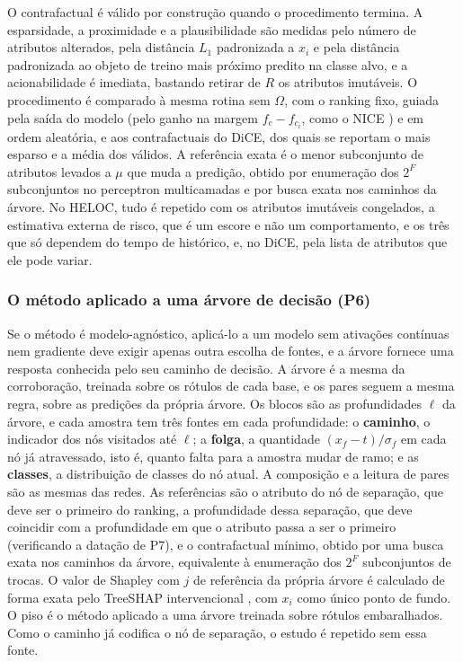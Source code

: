 O contrafactual é válido por construção quando o procedimento termina. A esparsidade, a proximidade e a plausibilidade \citep{Guidotti2022} são medidas pelo número de atributos alterados, pela distância $L_1$ padronizada a $x_i$ e pela distância padronizada ao objeto de treino mais próximo predito na classe alvo, e a acionabilidade é imediata, bastando retirar de $R$ os atributos imutáveis. O procedimento é comparado à mesma rotina sem $\Omega$, com o ranking fixo, guiada pela saída do modelo (pelo ganho na margem $f_c - f_{c_i}$, como o NICE \citep{Brughmans2024}) e em ordem aleatória, e aos contrafactuais do DiCE, dos quais se reportam o mais esparso e a média dos válidos. A referência exata é o menor subconjunto de atributos levados a $\mu$ que muda a predição, obtido por enumeração dos $2^{F}$ subconjuntos no perceptron multicamadas e por busca exata nos caminhos da árvore. No HELOC, tudo é repetido com os atributos imutáveis congelados, a estimativa externa de risco, que é um escore e não um comportamento, e os três que só dependem do tempo de histórico, e, no DiCE, pela lista de atributos que ele pode variar.

\subsubsection*{O método aplicado a uma árvore de decisão (P6)}

Se o método é modelo-agnóstico, aplicá-lo a um modelo sem ativações contínuas nem gradiente deve exigir apenas outra escolha de fontes, e a árvore fornece uma resposta conhecida pelo seu caminho de decisão. A árvore é a mesma da corroboração, treinada sobre os rótulos de cada base, e os pares seguem a mesma regra, sobre as predições da própria árvore. Os blocos são as profundidades $\ell$ da árvore, e cada amostra tem três fontes em cada profundidade: o \textbf{caminho}, o indicador dos nós visitados até $\ell$; a \textbf{folga}, a quantidade $(x_f - t)/\sigma_f$ em cada nó já atravessado, isto é, quanto falta para a amostra mudar de ramo; e as \textbf{classes}, a distribuição de classes do nó atual. A composição e a leitura de pares são as mesmas das redes. As referências são o atributo do nó de separação, que deve ser o primeiro do ranking, a profundidade dessa separação, que deve coincidir com a profundidade em que o atributo passa a ser o primeiro (verificando a datação de P7), e o contrafactual mínimo, obtido por uma busca exata nos caminhos da árvore, equivalente à enumeração dos $2^{F}$ subconjuntos de trocas. O valor de Shapley com $j$ de referência da própria árvore é calculado de forma exata pelo TreeSHAP intervencional \citep{Lundberg2020}, com $x_i$ como único ponto de fundo. O piso é o método aplicado a uma árvore treinada sobre rótulos embaralhados. Como o caminho já codifica o nó de separação, o estudo é repetido sem essa fonte.

